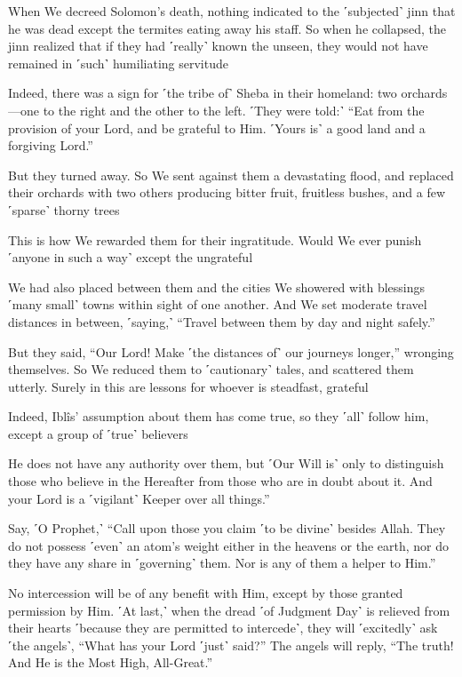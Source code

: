 When We decreed Solomon’s death, nothing indicated to the ˹subjected˺ jinn that he was dead except the termites eating away his staff. So when he collapsed, the jinn realized that if they had ˹really˺ known the unseen, they would not have remained in ˹such˺ humiliating servitude

Indeed, there was a sign for ˹the tribe of˺ Sheba in their homeland: two orchards—one to the right and the other to the left. ˹They were told:˺ “Eat from the provision of your Lord, and be grateful to Him. ˹Yours is˺ a good land and a forgiving Lord.”

But they turned away. So We sent against them a devastating flood, and replaced their orchards with two others producing bitter fruit, fruitless bushes, and a few ˹sparse˺ thorny trees

This is how We rewarded them for their ingratitude. Would We ever punish ˹anyone in such a way˺ except the ungrateful

We had also placed between them and the cities We showered with blessings ˹many small˺ towns within sight of one another. And We set moderate travel distances in between, ˹saying,˺ “Travel between them by day and night safely.”

But they said, “Our Lord! Make ˹the distances of˺ our journeys longer,” wronging themselves. So We reduced them to ˹cautionary˺ tales, and scattered them utterly. Surely in this are lessons for whoever is steadfast, grateful

Indeed, Iblîs’ assumption about them has come true, so they ˹all˺ follow him, except a group of ˹true˺ believers

He does not have any authority over them, but ˹Our Will is˺ only to distinguish those who believe in the Hereafter from those who are in doubt about it. And your Lord is a ˹vigilant˺ Keeper over all things.”

Say, ˹O Prophet,˺ “Call upon those you claim ˹to be divine˺ besides Allah. They do not possess ˹even˺ an atom’s weight either in the heavens or the earth, nor do they have any share in ˹governing˺ them. Nor is any of them a helper to Him.”

No intercession will be of any benefit with Him, except by those granted permission by Him. ˹At last,˺ when the dread ˹of Judgment Day˺ is relieved from their hearts ˹because they are permitted to intercede˺, they will ˹excitedly˺ ask ˹the angels˺, “What has your Lord ˹just˺ said?” The angels will reply, “The truth! And He is the Most High, All-Great.”

